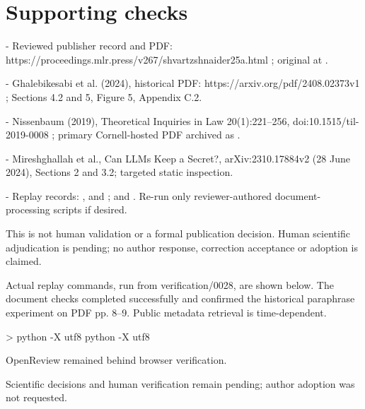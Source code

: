\documentclass[10pt]{article}
\begin{document}
\section*{Supporting checks}
- Reviewed publisher record and PDF: https://proceedings.mlr.press/v267/shvartzshnaider25a.html ; original at .\par
- Ghalebikesabi et al. (2024), historical PDF: https://arxiv.org/pdf/2408.02373v1 ; Sections 4.2 and 5, Figure 5, Appendix C.2.\par
- Nissenbaum (2019), Theoretical Inquiries in Law 20(1):221–256, doi:10.1515/til-2019-0008 ; primary Cornell-hosted PDF archived as .\par
- Mireshghallah et al., Can LLMs Keep a Secret?, arXiv:2310.17884v2 (28 June 2024), Sections 2 and 3.2; targeted static inspection.\par
- Replay records: , and ; and . Re-run only reviewer-authored document-processing scripts if desired.\par
This is not human validation or a formal publication decision. Human scientific adjudication is pending; no author response, correction acceptance or adoption is claimed.\par
Actual replay commands, run from verification/0028, are shown below. The document checks completed successfully and confirmed the historical paraphrase experiment on PDF pp. 8–9. Public metadata retrieval is time-dependent.\par
> python -X utf8 python -X utf8\par
OpenReview remained behind browser verification.\par
Scientific decisions and human verification remain pending; author adoption was not requested.\par
\end{document}
